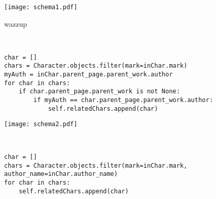 

\texttt{[image: schema1.pdf]}

wazzup

\begin{verbatim}
    

char = []
chars = Character.objects.filter(mark=inChar.mark)
myAuth = inChar.parent_page.parent_work.author
for char in chars:
    if char.parent_page.parent_work is not None:
        if myAuth == char.parent_page.parent_work.author:
            self.relatedChars.append(char)

\end{verbatim}
                    

\texttt{[image: schema2.pdf]}

\begin{verbatim}
    

char = []
chars = Character.objects.filter(mark=inChar.mark, author_name=inChar.author_name)
for char in chars:
    self.relatedChars.append(char)



\end{verbatim}
